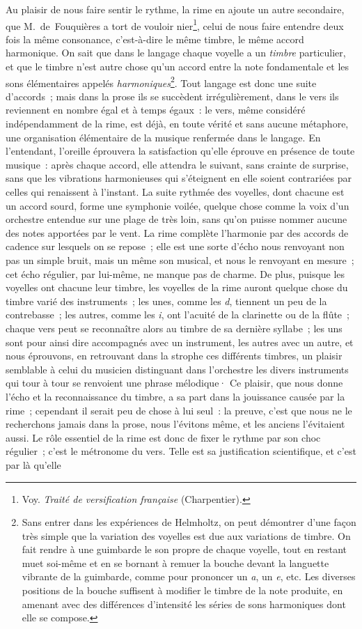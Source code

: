\documentclass[french,twoside]{book} %
\begin{document}
Au plaisir de nous faire sentir le rythme, la rime en  ajoute un autre secondaire, que M. de Fouquières a tort de vouloir nier\footnote{Voy. \emph{Traité de versification française} (Charpentier).}, celui de nous faire entendre deux fois la même consonance, c’est-à-dire le même timbre, le même accord harmonique. On sait que dans le langage chaque voyelle a un \emph{timbre} particulier, et que le timbre n’est autre chose qu’un accord entre la note fondamentale et les sons élémentaires appelés \emph{harmoniques}\footnote{Sans entrer dans les expériences de Helmholtz, on peut démontrer d’une façon très simple que la variation des voyelles est due aux variations de timbre. On fait rendre à une guimbarde le son propre de chaque voyelle, tout en restant muet soi-même et en se bornant à remuer la bouche devant la languette vibrante de la guimbarde, comme pour prononcer un \emph{a}, un \emph{e}, etc. Les diverses positions de la bouche suffisent à modifier le timbre de la note produite, en amenant avec des différences d’intensité les séries de sons harmoniques dont elle se compose.}. Tout langage est donc une suite d’accords ; mais dans la prose ils se succèdent irrégulièrement, dans le vers ils reviennent en nombre égal et à temps égaux : le vers, même considéré indépendamment de la rime, est déjà, en toute vérité et sans aucune métaphore, une organisation élémentaire de la musique renfermée dans le langage. En l’entendant, l’oreille éprouvera la satisfaction qu’elle éprouve en présence de toute musique : après chaque accord, elle attendra le suivant, sans crainte de surprise, sans que les vibrations harmonieuses qui s’éteignent en elle soient contrariées par celles qui renaissent à l’instant. La suite rythmée des voyelles, dont chacune est un accord sourd, forme une symphonie voilée, quelque chose comme la voix d’un orchestre entendue sur une plage de très loin, sans qu’on puisse nommer  aucune des notes apportées par le vent. La rime complète l’harmonie par des accords de cadence sur lesquels on se repose ; elle est une sorte d’écho nous renvoyant non pas un simple bruit, mais un même son musical, et nous le renvoyant en mesure ; cet écho régulier, par lui-même, ne manque pas de charme. De plus, puisque les voyelles ont chacune leur timbre, les voyelles de la rime auront quelque chose du timbre varié des instruments ; les unes, comme les \emph{d}, tiennent un peu de la contrebasse ; les autres, comme les \emph{i}, ont l’acuité de la clarinette ou de la flûte ; chaque vers peut se reconnaître alors au timbre de sa dernière syllabe ; les uns sont pour ainsi dire accompagnés avec un instrument, les autres avec un autre, et nous éprouvons, en retrouvant dans la strophe ces différents timbres, un plaisir semblable à celui du musicien distinguant dans l’orchestre les divers instruments qui tour à tour se renvoient une phrase mélodique· Ce plaisir, que nous donne l’écho et la reconnaissance du timbre, a sa part dans la jouissance causée par la rime ; cependant il serait peu de chose à lui seul : la preuve, c’est que nous ne le recherchons jamais dans la prose, nous l’évitons même, et les anciens l’évitaient aussi. Le rôle essentiel de la rime est donc de fixer le rythme par son choc régulier ; c’est le métronome du vers. Telle est sa justification scientifique, et c’est par là qu’elle 
\end{document}
